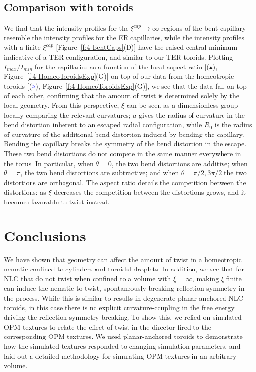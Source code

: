 \subsection{Comparison with toroids}
We find that the intensity profiles for the $\xi^{cap} \rightarrow \infty$ regions of the bent capillary resemble the intensity profiles for the ER capillaries, while the intensity profiles with a finite $\xi^{cap}$ [Figure~\ref{f:4-BentCaps}(D)] have the raised central minimum indicative of a TER configuration, and similar to our TER toroids.
Plotting $I_{max}/I_{min}$ for the capillaries as a function of the local aspect ratio [($\blacktriangle$), Figure~\ref{f:4-HomeoToroidsExp}(G)] on top of our data from the homeotropic toroids [(${\color{blue} \circ}$), Figure~\ref{f:4-HomeoToroidsExp}(G)], we see that the data fall on top of each other, confirming that the amount of twist is determined solely by the local geometry.
From this perspective, $\xi$ can be seen as a dimensionless group locally comparing the relevant curvatures; $a$ gives the radius of curvature in the bend distortion inherent to an escaped radial configuration, while $R_0$ is the radius of curvature of the additional bend distortion induced by bending the capillary.
Bending the capillary breaks the symmetry of the bend distortion in the escape.
These two bend distortions do not compete in the same manner everywhere in the torus.
In particular, when $\theta = 0$, the two bend distortions are additive; when $\theta = \pi$, the two bend distortions are subtractive; and when $\theta = \pi/2,3\pi/2$ the two distortions are orthogonal.
The aspect ratio details the competition between the distortions: as $\xi$ decreases the competition between the distortions grows, and it becomes favorable to twist instead.


\section{Conclusions}
We have shown that geometry can affect the amount of twist in a homeotropic nematic confined to cylinders and toroidal droplets.
In addition, we see that for NLC that do not twist when confined to a volume with $\xi = \infty$, making $\xi$ finite can induce the nematic to twist, spontaneously breaking reflection symmetry in the process.
While this is similar to results in degenerate-planar anchored NLC toroids, in this case there is no explicit curvature-coupling in the free energy driving the reflection-symmetry breaking.
To show this, we relied on simulated OPM textures to relate the effect of twist in the director fired to the corresponding OPM textures.
We used planar-anchored toroids to demonstrate how the simulated textures responded to changing simulation parameters, and laid out a detailed methodology for simulating OPM textures in an arbitrary volume.

